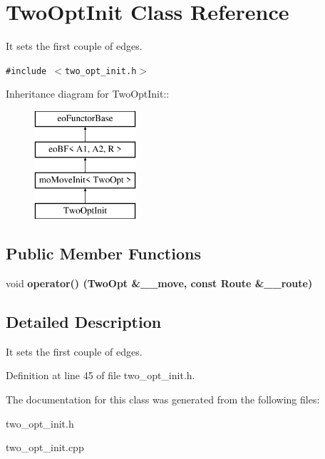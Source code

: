 \section{Two\-Opt\-Init Class Reference}
\label{class_two_opt_init}
It sets the first couple of edges.  


{\tt \#include $<$two\_\-opt\_\-init.h$>$}

Inheritance diagram for Two\-Opt\-Init::\begin{figure}[H]
\begin{center}
\leavevmode
\includegraphics[height=4cm]{class_two_opt_init}
\end{center}
\end{figure}
\subsection*{Public Member Functions}
\begin{CompactItemize}
\item 
void \bf{operator()} (\bf{Two\-Opt} \&\_\-\_\-move, const \bf{Route} \&\_\-\_\-route)\label{class_two_opt_init_5bf6af064d37ebd955ffb5a623e78e1b}

\end{CompactItemize}


\subsection{Detailed Description}
It sets the first couple of edges. 



Definition at line 45 of file two\_\-opt\_\-init.h.

The documentation for this class was generated from the following files:\begin{CompactItemize}
\item 
two\_\-opt\_\-init.h\item 
two\_\-opt\_\-init.cpp\end{CompactItemize}
